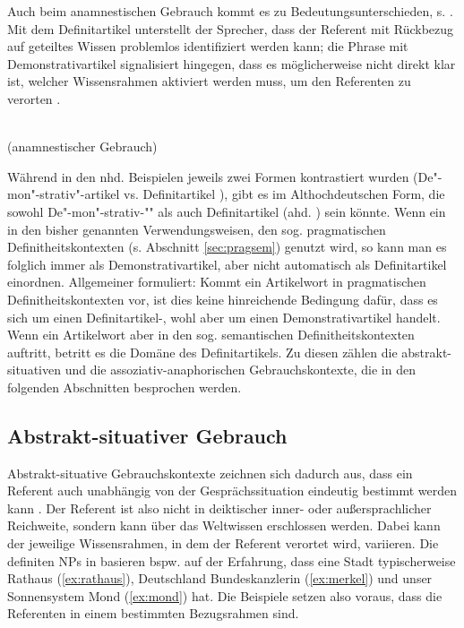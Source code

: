 Auch beim anamnestischen Gebrauch kommt es zu Bedeutungsunterschieden, s. . Mit dem Definitartikel unterstellt der Sprecher,  dass der Referent mit Rückbezug auf geteiltes Wissen problemlos identifiziert werden kann; die Phrase mit Demonstrativartikel signalisiert hingegen, dass es möglicherweise nicht direkt klar ist, welcher Wissensrahmen aktiviert werden muss, um den Referenten zu verorten \parencite[79f.]{Bisle-Muller1991}. 
 
\begin{exe}
	\ex \label{ex:anamndef}  \\ (anamnestischer Gebrauch)
\end{exe}
 
Während in den nhd. Beispielen jeweils zwei Formen kontrastiert wurden (De"-mon"-strativ"-artikel  vs. Definitartikel ), gibt es im Althochdeutschen  Form, die sowohl De"-mon"-strativ-"" als auch Definitartikel (ahd. ) sein könnte. 
Wenn ein   in den bisher genannten Verwendungsweisen, den sog. pragmatischen Definitheitskontexten (s. Abschnitt \ref{sec:pragsem}) genutzt wird, so kann man es folglich immer als Demonstrativartikel, aber nicht automatisch als Definitartikel einordnen. Allgemeiner formuliert: Kommt ein Artikelwort in pragmatischen Definitheitskontexten vor, ist dies keine  hinreichende Bedingung dafür, dass es sich um einen Definitartikel-, wohl aber um einen Demonstrativartikel handelt. Wenn ein Artikelwort aber in den sog. semantischen Definitheitskontexten auftritt, betritt es die Domäne des Definitartikels. Zu diesen zählen die abstrakt-situativen und die assoziativ-anaphorischen Gebrauchskontexte, die in den folgenden Abschnitten besprochen werden. 



\subsection{Abstrakt-situativer Gebrauch}\label{sec:abst-sit}

Abstrakt-situative Gebrauchskontexte zeichnen sich dadurch aus, dass ein Referent auch unabhängig von der Gesprächssituation eindeutig bestimmt werden kann \parencite[daher auch , vgl.][115]{Hawkins1978}. Der  Referent ist also nicht in deiktischer inner- oder außersprachlicher Reichweite, sondern kann über das Weltwissen erschlossen werden. Dabei kann der jeweilige Wissensrahmen, in dem der Referent verortet wird, variieren. Die definiten NPs in  basieren bspw. auf der Erfahrung, dass eine Stadt typischerweise  Rathaus (\ref{ex:rathaus}), Deutschland   Bundeskanzlerin (\ref{ex:merkel}) und unser Sonnensystem   Mond (\ref{ex:mond}) hat. Die Beispiele setzen also voraus, dass die Referenten in einem bestimmten Bezugsrahmen  \parencite{Russell2006} sind. 

